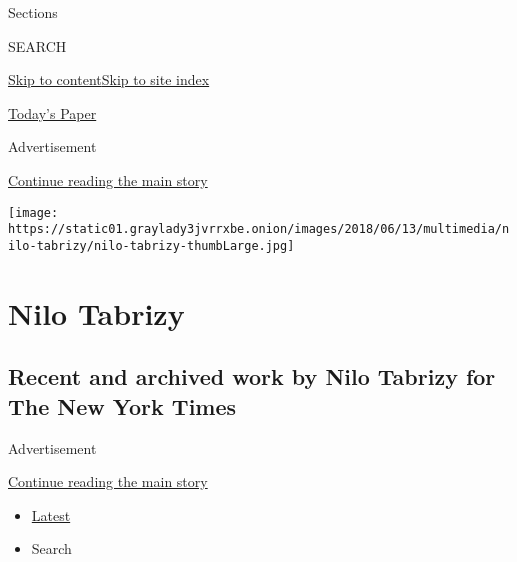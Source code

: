 Sections

SEARCH

\protect\hyperlink{site-content}{Skip to
content}\protect\hyperlink{site-index}{Skip to site index}

\href{https://myaccount.nytimes3xbfgragh.onion/auth/login?response_type=cookie\&client_id=vi}{}

\href{https://www.nytimes3xbfgragh.onion/section/todayspaper}{Today's
Paper}

Advertisement

\protect\hyperlink{after-top}{Continue reading the main story}

\texttt{[image: https://static01.graylady3jvrrxbe.onion/images/2018/06/13/multimedia/nilo-tabrizy/nilo-tabrizy-thumbLarge.jpg]}

\hypertarget{nilo-tabrizy}{%
\section{Nilo Tabrizy}\label{nilo-tabrizy}}

\hypertarget{recent-and-archived-work-by-nilo-tabrizy-for-the-new-york-times}{%
\subsection{Recent and archived work by Nilo Tabrizy for The New York
Times}\label{recent-and-archived-work-by-nilo-tabrizy-for-the-new-york-times}}

Advertisement

\protect\hyperlink{after-mid1}{Continue reading the main story}

\begin{itemize}
\tightlist
\item
  \protect\hyperlink{stream-panel}{Latest}
\item
  Search
\end{itemize}

